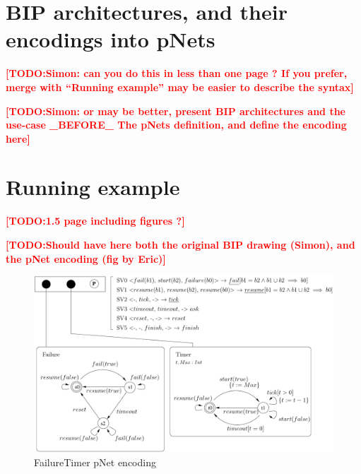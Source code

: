 \documentclass{lncs/llncs}
\newcommand{\TODO}[1]{\textcolor{red}{\textbf{[TODO:#1]}}}
\begin{document}
\section{BIP architectures, and their encodings into pNets}
\label{section:BIParchitectures}
\TODO{Simon: can you do this in less than one page ? If you prefer,
  merge with ``Running example'' may be easier to describe the syntax}

\TODO{Simon: or may be better, present BIP architectures and the use-case \_BEFORE\_ The pNets definition, and define the encoding here}

\section{Running example}
\label{section:FailureTimerMax}
\TODO{1.5 page including figures ?}


\TODO{Should have here both the original BIP drawing (Simon), and the
  pNet encoding (fig by Eric)}


\begin{figure}[t]
   \centerline{\includegraphics[width=12cm]{XFIG/FailureTimerPNET}}
   \caption{FailureTimer pNet encoding}  \label{schema:BIParchitecture}
 \end{figure}
\end{document}
